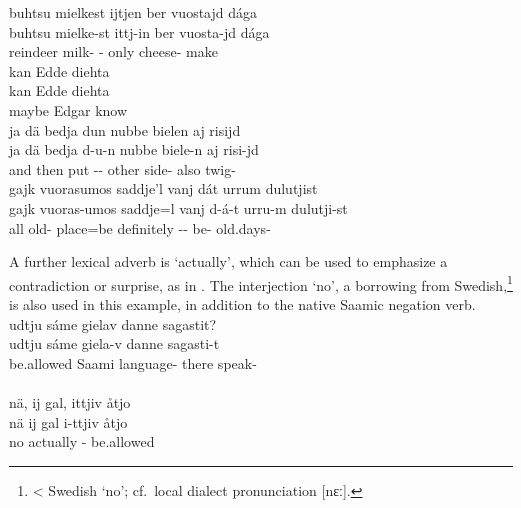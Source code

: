\ea\label{ADVsEx1}%
\glll	buhtsu mielkest ijtjen ber vuostajd dága\\
	buhtsu mielke-st ittj-in ber vuosta-jd dága\\
	reindeer\BS{} milk- - only cheese- make\BS{}\\\nopagebreak
{}	
\z
\ea\label{ADVsEx3}%
\glll	kan Edde diehta\\
	kan Edde diehta\\
	maybe Edgar\BS{} know\BS{}\\\nopagebreak
{}	
\z
\ea\label{ADVsEx3b}%
\glll	ja dä bedja dun nubbe bielen aj risijd\\
	ja dä bedja d-u-n nubbe biele-n aj risi-jd\\
	and then put\BS{} -- other side- also twig-\\\nopagebreak
{}	
\z
\ea\label{ADVsEx5}
\glll	gajk vuorasumos saddje'l vanj dát urrum dulutjist\\
	gajk vuoras-umos saddje=l vanj d-á-t urru-m dulutji-st\\
	all old- place\BS{}=be\BS{} definitely -- be- old.days-\\\nopagebreak
{}	
\z

A further lexical adverb is  ‘actually’, which can be used to emphasize a contradiction or surprise, as in . The interjection  ‘no’, a borrowing from Swedish,\footnote{< Swedish  ‘no’; cf.~local dialect pronunciation [nɛː].} 
is also used in this example, in addition to the native Saamic negation verb. 
\ea\label{particleEx6}
\glll	{} udtju sáme gielav danne sagastit?\\
	{} udtju sáme giela-v danne sagasti-t\\
	{} be.allowed\BS{} Saami\BS{} language- there speak-\\\nopagebreak
{}\\
\glll	{} nä, ij gal, ittjiv åtjo\\
	{} nä ij gal i-ttjiv åtjo\\
	{} no \BS{} actually - be.allowed\BS{}\\\nopagebreak
{}	
\z


